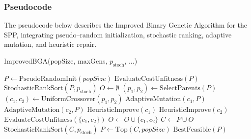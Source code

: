 \documentclass[12pt]{article}
\begin{document}
\subsubsection{Pseudocode}
The pseudocode below describes the Improved Binary Genetic Algorithm for the SPP, integrating pseudo–random initialization, stochastic ranking, adaptive mutation, and heuristic repair.
\begin{algorithm}[htbp]
  \caption{ImprovedBGA(popSize, maxGens, \(p_{\mathrm{stoch}}\), ...)}
  \begin{algorithmic}[1]
    \State \(P \gets \text{PseudoRandomInit}(popSize)\) 
    \State \(\text{EvaluateCostUnfitness}(P)\) 
      \State \(\text{StochasticRankSort}(P, p_{\mathrm{stoch}})\) 
      \State \(O \gets \emptyset\) 
        \State \((p_1, p_2) \gets \text{SelectParents}(P)\) 
        \State \((c_1, c_2) \gets \text{UniformCrossover}(p_1, p_2)\) 
        \State \(\text{AdaptiveMutation}(c_1, P)\) 
        \State \(\text{AdaptiveMutation}(c_2, P)\) 
        \State \(\text{HeuristicImprove}(c_1)\) 
        \State \(\text{HeuristicImprove}(c_2)\) 
        \State \(\text{EvaluateCostUnfitness}(\{c_1, c_2\})\) 
        \State \(O \gets O \cup \{c_1, c_2\}\) 
      \EndWhile
      \State \(C \gets P \cup O\) 
      \State \(\text{StochasticRankSort}(C, p_{\mathrm{stoch}})\) 
      \State \(P \gets \text{Top}(C, popSize)\) 
    \EndFor
    \State \Return \(\text{BestFeasible}(P)\) 
  \end{algorithmic}
  \end{algorithm}
\end{document}
